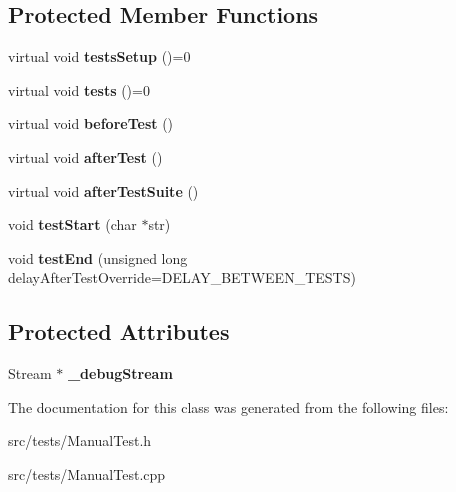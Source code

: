 \subsection*{Protected Member Functions}
\begin{DoxyCompactItemize}
\item 
\mbox{\label{class_manual_test_ab3c40aab099320672b7524b84582fef1}} 
virtual void {\bfseries tests\+Setup} ()=0
\item 
\mbox{\label{class_manual_test_a34284ba4f0d9cf915bee6d3f18adab82}} 
virtual void {\bfseries tests} ()=0
\item 
\mbox{\label{class_manual_test_a20134c6b27c5f09e92c6957b0cb2fc8b}} 
virtual void {\bfseries before\+Test} ()
\item 
\mbox{\label{class_manual_test_a9450c75b9bbbab5540195f216a61449e}} 
virtual void {\bfseries after\+Test} ()
\item 
\mbox{\label{class_manual_test_a7bade8194573f592eb16503de3017d86}} 
virtual void {\bfseries after\+Test\+Suite} ()
\item 
\mbox{\label{class_manual_test_ab66c12b2cecf1e09532a8da12e97b036}} 
void {\bfseries test\+Start} (char $\ast$str)
\item 
\mbox{\label{class_manual_test_a1ea97c89dcceb0e686c9973eda31ed1a}} 
void {\bfseries test\+End} (unsigned long delay\+After\+Test\+Override=D\+E\+L\+A\+Y\+\_\+\+B\+E\+T\+W\+E\+E\+N\+\_\+\+T\+E\+S\+TS)
\end{DoxyCompactItemize}
\subsection*{Protected Attributes}
\begin{DoxyCompactItemize}
\item 
\mbox{\label{class_manual_test_afc47b14a8b3427b999b63451aee90f4e}} 
Stream $\ast$ {\bfseries \+\_\+debug\+Stream}
\end{DoxyCompactItemize}


The documentation for this class was generated from the following files\+:\begin{DoxyCompactItemize}
\item 
src/tests/Manual\+Test.\+h\item 
src/tests/Manual\+Test.\+cpp\end{DoxyCompactItemize}
